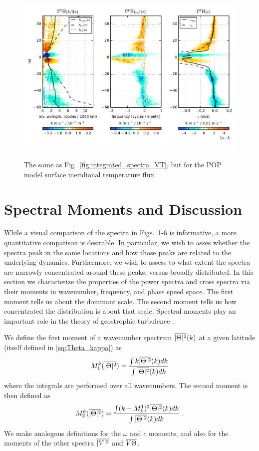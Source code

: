 \documentclass[10pt]{article}
\newcommand{\ol}{\ensuremath{\overline}}
\begin{document}
\begin{figure}[t]
  \noindent\includegraphics{../figures/POP_50degwide/integrated_spectra_VT.pdf}\\
  \caption{The same as Fig.~\ref{fig:integrated_spectra_VT}, but for the POP model surface meridional temperature flux.}
  \label{fig:integrated_spectra_VT_POP}
\end{figure}


\section{Spectral Moments and Discussion}

While a visual comparison of the spectra in Figs.~1-6 is informative, a more quantitative comparison is desirable. In particular, we wish to asses whether the spectra peak in the same locations and how those peaks are related to the underlying dynamics. Furthermore, we wish to assess to what extent the spectra are narrowly concentrated around these peaks, versus broadly distributed. In this section we characterize the properties of the power spectra and cross spectra via their moments in wavenumber, frequency, and phase speed space. The first moment tells us about the dominant scale. The second moment tells us how concentrated the distribution is about that scale. Spectral moments play an important role in the theory of geostrophic turbulence \citep[e.g.][]{Rhines1975}.

We define the first moment of a wavenumber spectrum $\ol{|\Theta|^2}(k)$ at a given latitude (itself defined in \ref{eq:Theta_kappa}) as
\begin{equation}
M^k_1 ( \ol{|\Theta|^2} ) = \frac{ \int k \ol{|\Theta|^2}(k) d k }{ \int \ol{|\Theta|^2}(k) d k }
\label{eq:M1}
\end{equation}
where the integrals are performed over all wavenumbers. The second moment is then defined as
\begin{equation}
M^k_2 (\ol{ |\Theta|^2 }) = \frac{ \int (k - M^1_k)^2 \ol{|\Theta|^2}(k) d k }{ \int \ol{|\Theta|^2}(k) d k } \ .
\label{eq:M2}
\end{equation}
We make analogous definitions for the $\omega$ and $c$ moments, and also for the moments of the other spectra $\ol{|V|^2}$ and $\ol{V \Theta}$. 
\end{document}
